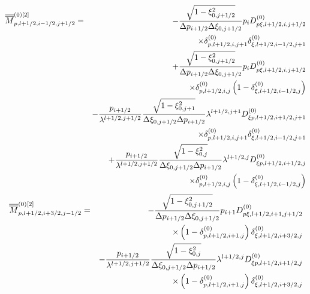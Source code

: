 \begin{eqnarray}
\overline{\overline{M}}_{p,l+1/2,i-1/2,j+1/2}^{\left( 0\right) \left[ 2%
\right] } &=&-\frac{\sqrt{1-\xi _{0,j+1/2}^{2}}}{\Delta p_{i+1/2}\Delta \xi
_{0,j+1/2}}p_{i}D_{p\xi ,l+1/2,i,j+1/2}^{\left( 0\right) }  \notag \\
&&\times \delta _{p,l+1/2,i,j+1}^{\left( 0\right) }\delta _{\xi
,l+1/2,i-1/2,j+1}^{\left( 0\right) }  \notag \\
&&+\frac{\sqrt{1-\xi _{0,j+1/2}^{2}}}{\Delta p_{i+1/2}\Delta \xi _{0,j+1/2}}%
p_{i}D_{p\xi ,l+1/2,i,j+1/2}^{\left( 0\right) }  \notag \\
&&\times \delta _{p,l+1/2,i,j}^{\left( 0\right) }\left( 1-\delta _{\xi
,l+1/2,i-1/2,j}^{\left( 0\right) }\right)   \notag \\
&&-\frac{p_{i+1/2}}{\lambda ^{l+1/2,j+1/2}}\frac{\sqrt{1-\xi _{0,j+1}^{2}}}{%
\Delta \xi _{0,j+1/2}\Delta p_{i+1/2}}\lambda ^{l+1/2,j+1}D_{\xi
p,l+1/2,i+1/2,j+1}^{\left( 0\right) }  \notag \\
&&\times \delta _{p,l+1/2,i,j+1}^{\left( 0\right) }\delta _{\xi
,l+1/2,i-1/2,j+1}^{\left( 0\right) }  \notag \\
&&+\frac{p_{i+1/2}}{\lambda ^{l+1/2,j+1/2}}\frac{\sqrt{1-\xi _{0,j}^{2}}}{%
\Delta \xi _{0,j+1/2}\Delta p_{i+1/2}}\lambda ^{l+1/2,j}D_{\xi
p,l+1/2,i+1/2,j}^{\left( 0\right) }  \notag \\
&&\times \delta _{p,l+1/2,i,j}^{\left( 0\right) }\left( 1-\delta _{\xi
,l+1/2,i-1/2,j}^{\left( 0\right) }\right) 
\end{eqnarray}%
\begin{eqnarray}
\overline{\overline{M}}_{p,l+1/2,i+3/2,j-1/2}^{\left( 0\right) \left[ 2%
\right] } &=&-\frac{\sqrt{1-\xi _{0,j+1/2}^{2}}}{\Delta p_{i+1/2}\Delta \xi
_{0,j+1/2}}p_{i+1}D_{p\xi ,l+1/2,i+1,j+1/2}^{\left( 0\right) }  \notag \\
&&\times \left( 1-\delta _{p,l+1/2,i+1,j}^{\left( 0\right) }\right) \delta
_{\xi ,l+1/2,i+3/2,j}^{\left( 0\right) }  \notag \\
&&-\frac{p_{i+1/2}}{\lambda ^{l+1/2,j+1/2}}\frac{\sqrt{1-\xi _{0,j}^{2}}}{%
\Delta \xi _{0,j+1/2}\Delta p_{i+1/2}}\lambda ^{l+1/2,j}D_{\xi
p,l+1/2,i+1/2,j}^{\left( 0\right) }  \notag \\
&&\times \left( 1-\delta _{p,l+1/2,i+1,j}^{\left( 0\right) }\right) \delta
_{\xi ,l+1/2,i+3/2,j}^{\left( 0\right) }
\end{eqnarray}%
